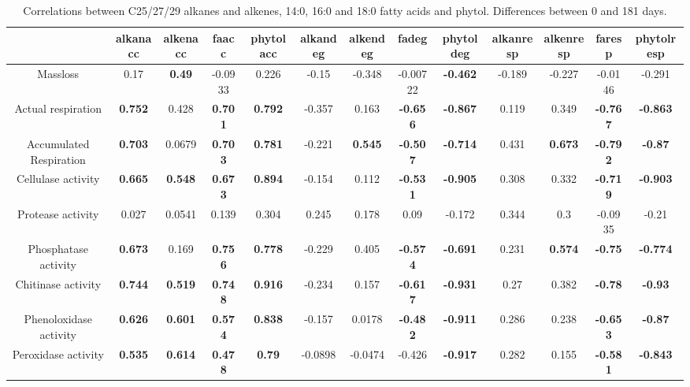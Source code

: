 \documentclass[authoryear,preprint,review,12pt]{elsarticle}
\begin{document}
\newpage
\begin{landscape}
\begin{table}[h!]
\begin{center}
\caption{Correlations between C25/27/29 alkanes and alkenes, 14:0, 16:0 and 18:0 fatty acids and phytol. Differences between 0 and 181 days.}
\label{corrtable_notlig}
{\tiny
\begin{tabular}{ccccccccccccc}
  \hline
 & alkanacc & alkenacc & faacc & phytolacc & alkandeg & alkendeg & fadeg & phytoldeg & alkanresp & alkenresp & faresp & phytolresp \\ 
  \hline
Massloss & 0.17 & \textbf{ 0.49 } & -0.0933 & 0.226 & -0.15 & -0.348 & -0.00722 & \textbf{ -0.462 } & -0.189 & -0.227 & -0.0146 & -0.291 \\ 
  Actual respiration & \textbf{ 0.752 } & 0.428 & \textbf{ 0.701 } & \textbf{ 0.792 } & -0.357 & 0.163 & \textbf{ -0.656 } & \textbf{ -0.867 } & 0.119 & 0.349 & \textbf{ -0.767 } & \textbf{ -0.863 } \\ 
  Accumulated Respiration & \textbf{ 0.703 } & 0.0679 & \textbf{ 0.703 } & \textbf{ 0.781 } & -0.221 & \textbf{ 0.545 } & \textbf{ -0.507 } & \textbf{ -0.714 } & 0.431 & \textbf{ 0.673 } & \textbf{ -0.792 } & \textbf{ -0.87 } \\ 
  Cellulase activity & \textbf{ 0.665 } & \textbf{ 0.548 } & \textbf{ 0.673 } & \textbf{ 0.894 } & -0.154 & 0.112 & \textbf{ -0.531 } & \textbf{ -0.905 } & 0.308 & 0.332 & \textbf{ -0.719 } & \textbf{ -0.903 } \\ 
  Protease activity & 0.027 & 0.0541 & 0.139 & 0.304 & 0.245 & 0.178 & 0.09 & -0.172 & 0.344 &  0.3 & -0.0935 & -0.21 \\ 
  Phosphatase activity & \textbf{ 0.673 } & 0.169 & \textbf{ 0.756 } & \textbf{ 0.778 } & -0.229 & 0.405 & \textbf{ -0.574 } & \textbf{ -0.691 } & 0.231 & \textbf{ 0.574 } & \textbf{ -0.75 } & \textbf{ -0.774 } \\ 
  Chitinase activity & \textbf{ 0.744 } & \textbf{ 0.519 } & \textbf{ 0.748 } & \textbf{ 0.916 } & -0.234 & 0.157 & \textbf{ -0.617 } & \textbf{ -0.931 } & 0.27 & 0.382 & \textbf{ -0.78 } & \textbf{ -0.93 } \\ 
  Phenoloxidase activity & \textbf{ 0.626 } & \textbf{ 0.601 } & \textbf{ 0.574 } & \textbf{ 0.838 } & -0.157 & 0.0178 & \textbf{ -0.482 } & \textbf{ -0.911 } & 0.286 & 0.238 & \textbf{ -0.653 } & \textbf{ -0.87 } \\ 
  Peroxidase activity & \textbf{ 0.535 } & \textbf{ 0.614 } & \textbf{ 0.478 } & \textbf{ 0.79 } & -0.0898 & -0.0474 & -0.426 & \textbf{ -0.917 } & 0.282 & 0.155 & \textbf{ -0.581 } & \textbf{ -0.843 } \\ 

\end{tabular}}
\end{center}
\end{table}
\end{landscape}
\end{document}
